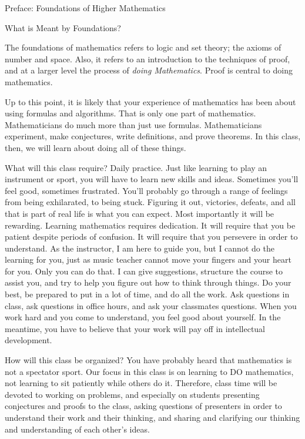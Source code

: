 \documentclass[11pt]{article}
\begin{document}
\addtocounter{section}{-1}

\begin{section}{Preface: Foundations of Higher Mathematics}

\begin{subsection}{What is Meant by Foundations?}

The foundations of mathematics refers to logic and set theory; the axioms of number and space.  Also, it refers to an introduction to the techniques of proof, and at a larger level the process of \emph{doing Mathematics}.  Proof is central to doing mathematics.

Up to this point, it is likely that your experience of mathematics has been about using formulas and algorithms. That is only one part of mathematics. Mathematicians do much more than just use formulas.  Mathematicians experiment, make conjectures, write definitions, and prove theorems.  In this class, then, we will learn about doing all of these things.

What will this class require?  Daily practice.  Just like learning to play an instrument or sport, you will have to learn new skills and ideas.  Sometimes you'll feel good, sometimes frustrated.  You'll probably go through a range of feelings from being exhilarated, to being stuck.  Figuring it out, victories, defeats, and all that is part of real life is what you can expect.  Most importantly it will be rewarding.  Learning mathematics requires dedication.  It will require that you be patient despite periods of confusion.  It will require that you persevere in order to understand.  As the instructor, I am here to guide you, but I cannot do the learning for you, just as music teacher cannot move your fingers and your heart for you.  Only you can do that.  I can give suggestions, structure the course to assist you, and try to help you figure out how to think through things.  Do your best, be prepared to put in a lot of time, and do all the work.  Ask questions in class, ask questions in office hours, and ask your classmates questions.  When you work hard and you come to understand, you feel good about yourself.  In the meantime, you have to believe that your work will pay off in intellectual development.

How will this class be organized?  You have probably heard that mathematics is not a spectator sport.  Our focus in this class is on learning to DO mathematics, not learning to sit patiently while others do it.  Therefore, class time will be devoted to working on problems, and especially on students presenting conjectures and proofs to the class, asking questions of presenters in order to understand their work and their thinking, and sharing and clarifying our thinking and understanding of each other's ideas.  


\end{subsection}
\end{section}
\end{document}
